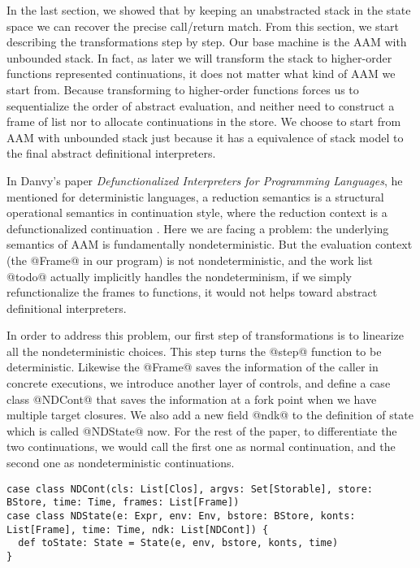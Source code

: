 \documentclass[acmsmall,review,anonymous]{acmart}\settopmatter{printfolios=true,printccs=false,printacmref=false}
\begin{document}
In the last section, we showed that by keeping an unabstracted stack in the state
space we can recover the precise call/return match.
From this section, we start describing the transformations step by step.
Our base machine is the AAM with unbounded stack.
In fact, as later we will transform the stack to higher-order functions
represented continuations, it does not matter what kind of AAM we start from.
Because transforming to higher-order functions forces us to sequentialize
the order of abstract evaluation, and neither need to construct a frame of list
nor to allocate continuations in the store.
We choose to start from AAM with unbounded stack just because it has a
equivalence of stack model to the final abstract definitional interpreters.


In Danvy's paper \textit{Defunctionalized Interpreters for Programming
  Languages}, he mentioned for deterministic languages, a reduction semantics
is a structural operational semantics in continuation style, where the reduction
context is a defunctionalized continuation \cite{Danvy:2008:DIP:1411204.1411206}.
Here we are facing a problem:
the underlying semantics of AAM is fundamentally nondeterministic.
But the evaluation context (the @Frame@ in our program) is not
nondeterministic, and the work list @todo@ actually implicitly handles the nondeterminism,
if we simply refunctionalize the frames to functions, it would not helps toward
abstract definitional interpreters.

In order to address this problem, our first step of transformations
is to linearize all the nondeterministic choices.
This step turns the @step@ function to be deterministic.
Likewise the @Frame@ saves the information of the caller in concrete executions,
we introduce another layer of controls, and define a case class @NDCont@
that saves the information at a fork point when we have multiple target closures.
We also add a new field @ndk@ to the definition of state which is called
@NDState@ now.
For the rest of the paper, to differentiate the two continuations, we would call
the first one as normal continuation, and the second one as nondeterministic
continuations.

\begin{lstlisting}
case class NDCont(cls: List[Clos], argvs: Set[Storable], store: BStore, time: Time, frames: List[Frame])
case class NDState(e: Expr, env: Env, bstore: BStore, konts: List[Frame], time: Time, ndk: List[NDCont]) {
  def toState: State = State(e, env, bstore, konts, time)
}
\end{lstlisting}
\end{document}
